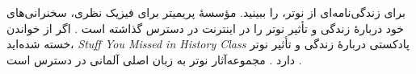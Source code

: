 \documentclass[../../../include/open-logic-section]{subfiles}
\begin{document}
\begin{reading}
برای زندگی‌نامه‌ای از نوتر، \citet{Dick1981} را ببینید. مؤسسهٔ
پریمیتر برای فیزیک نظری، سخنرانی‌های خود دربارهٔ زندگی و تأثیر نوتر را
در اینترنت در دسترس گذاشته است \citep{Perimeter2015}. اگر از خواندن
خسته شده‌اید، \emph{Stuff You Missed in History Class} پادکستی دربارهٔ
زندگی و تأثیر نوتر دارد \citep{Frey2015}. مجموعه‌آثار نوتر به زبان
اصلی آلمانی در دسترس است \citep{Noether1983}.
\end{reading}
\end{document}
